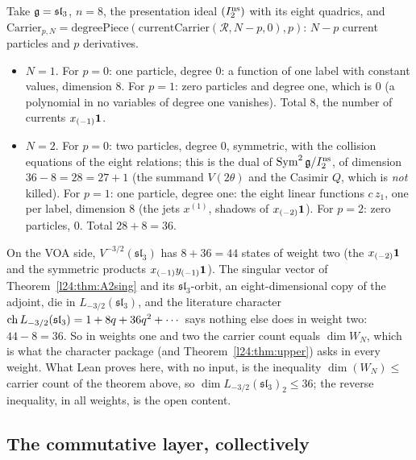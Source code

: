 \begin{example}\label{l24:ex:A2weight2}
Take $\mathfrak g=\mathfrak{sl}_3$, $n=8$, the presentation ideal $(I_2^{\mathrm{ns}})$ with its eight quadrics, and
$\mathrm{Carrier}_{p,N}=\mathrm{degreePiece}(\mathrm{currentCarrier}(\mathcal R,N-p,0),p)$: $N-p$ current particles and
$p$ derivatives.
\begin{itemize}
\item $N=1$. For $p=0$: one particle, degree $0$: a function of one label with constant values, dimension $8$. For $p=1$:
  zero particles and degree one, which is $0$ (a polynomial in no variables of degree one vanishes). Total $8$, the
  number of currents $x_{(-1)}\mathbf 1$.
\item $N=2$. For $p=0$: two particles, degree $0$, symmetric, with the collision equations of the eight relations; this
  is the dual of $\operatorname{Sym}^2\mathfrak g/I_2^{\mathrm{ns}}$, of dimension $36-8=28=27+1$ (the summand $V(2\theta)$
  and the Casimir $Q$, which is \emph{not} killed). For $p=1$: one particle, degree one: the eight linear functions
  $c\,z_1$, one per label, dimension $8$ (the jets $x^{(1)}$, shadows of $x_{(-2)}\mathbf 1$). For $p=2$: zero
  particles, $0$. Total $28+8=36$.
\end{itemize}
On the VOA side, $V^{-3/2}(\mathfrak{sl}_3)$ has $8+36=44$ states of weight two (the $x_{(-2)}\mathbf 1$ and the
symmetric products $x_{(-1)}y_{(-1)}\mathbf 1$). The singular vector of Theorem~\ref{l24:thm:A2sing} and its
$\mathfrak{sl}_3$-orbit, an eight-dimensional copy of the adjoint, die in $L_{-3/2}(\mathfrak{sl}_3)$, and the literature character
$\operatorname{ch} L_{-3/2}(\mathfrak{sl}_3)=1+8q+36q^2+\cdots$ says nothing else does in weight two: $44-8=36$. So in weights
one and two the carrier count equals $\dim W_N$, which is what the character package (and Theorem~\ref{l24:thm:upper})
asks in every weight. What Lean proves here, with no input, is the inequality $\dim(W_N)\le$ carrier count of the
theorem above, so $\dim L_{-3/2}(\mathfrak{sl}_3)_2\le36$; the reverse inequality, in all weights, is the open
content.
\end{example}

\subsection{The commutative layer, collectively}\label{l24:sec:commutative}

